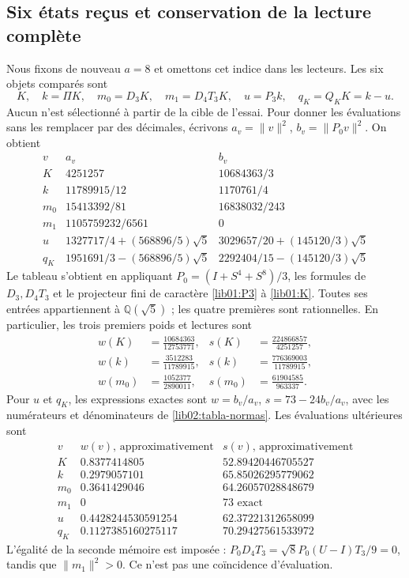 \subsection{Six états reçus et conservation de la lecture complète}
\label{lib02:seis-estados}

Nous fixons de nouveau \(a=8\) et omettons cet indice dans les lecteurs.
Les six objets comparés sont
\[
 K,\quad k=\Pi K,\quad m_0=D_3K,\quad m_1=D_4T_3K,
 \quad u=P_3k,\quad q_K=Q_KK=k-u.
\]
Aucun n’est sélectionné à partir de la cible de l’essai. Pour donner les
évaluations sans les remplacer par des décimales, écrivons
\(a_v=\|v\|^2\), \(b_v=\|P_0v\|^2\). On obtient
\begin{equation}
\begin{array}{c|c|c}
 v&a_v&b_v\\\hline
 K&4251257&10684363/3\\
 k&11789915/12&1170761/4\\
 m_0&15413392/81&16838032/243\\
 m_1&1105759232/6561&0\\
 u&1327717/4+(568896/5)\sqrt5
   &3029657/20+(145120/3)\sqrt5\\
 q_K&1951691/3-(568896/5)\sqrt5
   &2292404/15-(145120/3)\sqrt5
\end{array}
 \label{lib02:tabla-normas}
\end{equation}
Le tableau s'obtient en appliquant \(P_0=(I+S^4+S^8)/3\), les formules de \(D_3,D_4T_3\) et le projecteur fini de caractère \eqref{lib01:P3} à \eqref{lib01:K}. Toutes ses entrées appartiennent à \(\mathbb Q(\sqrt5)\) ; les quatre premières sont rationnelles. En particulier, les trois premiers poids et lectures sont
\begin{align*}
 w(K)&=\frac{10684363}{12753771},&
 s(K)&=\frac{224866857}{4251257},\\
 w(k)&=\frac{3512283}{11789915},&
 s(k)&=\frac{776369003}{11789915},\\
 w(m_0)&=\frac{1052377}{2890011},&
 s(m_0)&=\frac{61904585}{963337}.
\end{align*}
Pour \(u\) et \(q_K\), les expressions exactes sont
\(w=b_v/a_v\), \(s=73-24b_v/a_v\), avec les numérateurs et
dénominateurs de \eqref{lib02:tabla-normas}. Les évaluations ultérieures
sont
\[
\begin{array}{c|c|c}
 v&w(v)\text{, approximativement}&s(v)\text{, approximativement}\\\hline
 K&0.8377414805&52.89420446705527\\
 k&0.2979057101&65.85026295779062\\
 m_0&0.3641429046&64.26057028848679\\
 m_1&0&73\text{ exact}\\
 u&0.4428244530591254&62.37221312658099\\
 q_K&0.1127385160275117&70.29427561533972
\end{array}
\]
L’égalité de la seconde mémoire est imposée :
\(P_0D_4T_3=\sqrt8P_0(U-I)T_3/9=0\), tandis que
\(\|m_1\|^2>0\). Ce n’est pas une coïncidence d’évaluation.

